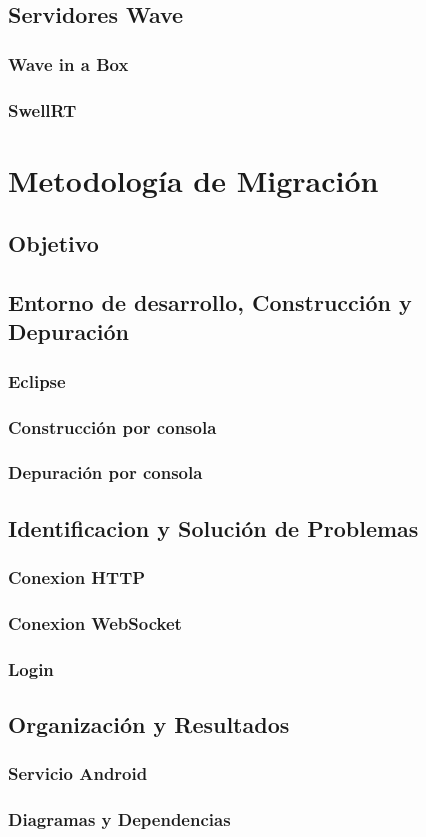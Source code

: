   \subsection{Servidores Wave}
    \subsubsection{Wave in a Box}
    \subsubsection{SwellRT}
  
\section{Metodología de Migración}
  
  \subsection{Objetivo}
  
  \subsection{Entorno de desarrollo, Construcción y Depuración}
    \subsubsection{Eclipse}
    \subsubsection{Construcción por consola}
    \subsubsection{Depuración por consola}
    
  \subsection{Identificacion y Solución de Problemas}
    \subsubsection{Conexion HTTP}
    \subsubsection{Conexion WebSocket}
    \subsubsection{Login}
  
  \subsection{Organización y Resultados}
    \subsubsection{Servicio Android}
    \subsubsection{Diagramas y Dependencias}